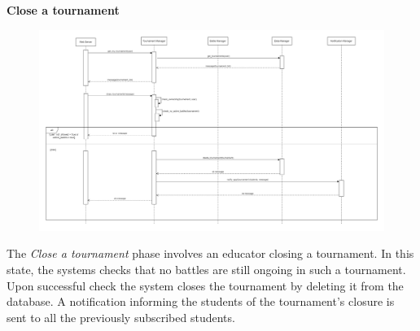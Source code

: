 \documentclass[../DD.tex]{subfiles}
\begin{document}
    \textbf{Close a tournament}\\
    \begin{figure}[H]
        \centering
        \hspace*{-3cm}
        \includegraphics[width=1.4\textwidth]{../assets/section_2/CloseTournament.png}
    \end{figure}
    The \textit{Close a tournament} phase involves an educator closing a tournament.
    In this state, the systems checks that no battles are still ongoing in such a tournament.
    Upon successful check the system closes the tournament by deleting it from the database.
    A notification informing the students of the tournament's closure is sent to all the previously subscribed students.
    \newpage
\end{document}
